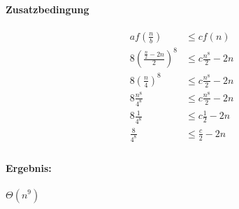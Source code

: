 \documentclass[12pt,letterpaper]{article}
\begin{document}
\paragraph{Zusatzbedingung}
\begin{align}
    a f(\frac{n}{b})             & \leq c f(n)          \\
    8(\frac{\frac{n}{2} - 2n}{2})^{8} & \leq c \frac{n^8}{2} - 2n \\
    8(\frac{n}{4})^{8}           & \leq c \frac{n^8}{2} - 2n \\
    8\frac{n^8}{4^8}             & \leq c \frac{n^8}{2} - 2n \\
    8\frac{1}{4^8}               & \leq c \frac{1}{2} - 2n   \\
    \frac{8}{4^8}                & \leq \frac{c}{2} - 2n    \\
\end{align}


\paragraph{Ergebnis:}
$ \Theta(n^9)$
\end{document}
